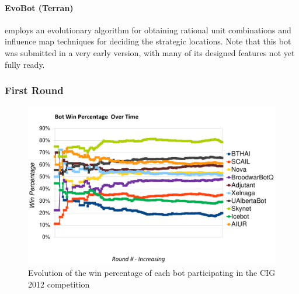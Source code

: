 \documentclass{llncs}
\begin{document}
\paragraph*{EvoBot (Terran)} employs an evolutionary algorithm for obtaining rational
 unit combinations and influence map techniques for deciding the strategic locations. Note
 that this bot was submitted in a very early version, with many of its designed features not
 yet fully ready. 

\subsubsection*{First Round}
\label{sec:cig-first-round}

\begin{figure}[t]
    \centering
    \includegraphics[width=\columnwidth]{figures/cig2012-ResultsRound90.pdf}
    \caption{Evolution of the win percentage of each bot participating in the
CIG 2012 competition}
    \label{fig:cig2012-results}
\end{figure}
\end{document}

